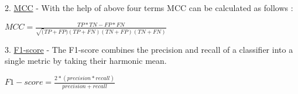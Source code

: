 2. \underline{MCC} - With the help of above four terms MCC can be calculated as follows :
\begin{center}
$MCC = \frac{TP*TN-FP*FN}{\sqrt(TP+FP)(TP+FN)(TN+FP)(TN+FN)}$ \newline
\end{center}

3. \underline{F1-score} - The F1-score combines the precision and recall of a classifier into a single metric by taking their harmonic mean. 
\begin{center}
    $F1-score = \frac{2*(precision*recall)}{precision + recall}$\newline
\end{center}